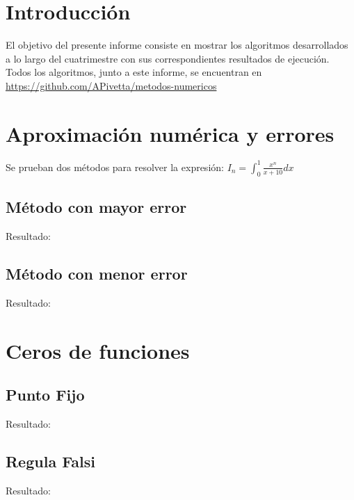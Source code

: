 \documentclass[a4paper,10pt]{article}
\title{  }
\begin{document}
	\maketitle %
	\newpage

	\tableofcontents %
	\newpage

	\section{Introducci\'on}
		El objetivo del presente informe consiste en mostrar los algoritmos desarrollados a lo largo del cuatrimestre con sus correspondientes resultados de ejecuci\'on. Todos los algoritmos, junto a este informe, se encuentran en \url{https://github.com/APivetta/metodos-numericos} 

	\section{Aproximaci\'on num\'erica y errores}
		Se prueban dos m\'etodos para resolver la expresi\'on: $I_n = \int_{0}^{1} \frac{x^n}{x + 10} dx$

		\subsection{M\'etodo con mayor error}
 			
 			Resultado:
 			

		\subsection{M\'etodo con menor error}
 			
 			Resultado:
 			

	\section{Ceros de funciones}

		\subsection{Punto Fijo}
 			
 			Resultado:
 			

		\subsection{Regula Falsi}
 			
 			Resultado:
 			
\end{document}
